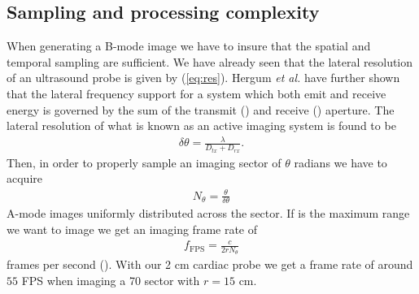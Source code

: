 \subsection{Sampling and processing complexity}
When generating a B-mode image we have to insure that the spatial and temporal sampling are sufficient. We have already seen that the lateral resolution of an ultrasound probe is given by (\ref{eq:res}).  Hergum \textit{et al.} \cite{Hergum2009} have further shown that the lateral frequency support for a system which both emit and receive energy is governed by the sum of the transmit () and receive () aperture. The lateral resolution of what is known as an active imaging system is found to be
\begin{align}
\delta\theta = \frac{\lambda}{D_{tx} + D_{rx}}.
\end{align}
Then, in order to properly sample an imaging sector of $\theta$ radians we have to acquire 
\begin{align}
N_\theta = \frac{\theta}{\delta\theta}
\end{align}
A-mode images uniformly distributed across the sector. If  is the maximum range we want to image we get an imaging frame rate of
\begin{align}
f_{\text{FPS}} = \frac{c}{2rN_\theta}
\end{align} 
frames per second (). With our 2 cm cardiac probe we get a frame rate of around $55$ FPS when imaging a 70\degree{} sector with $r=15$ cm.

